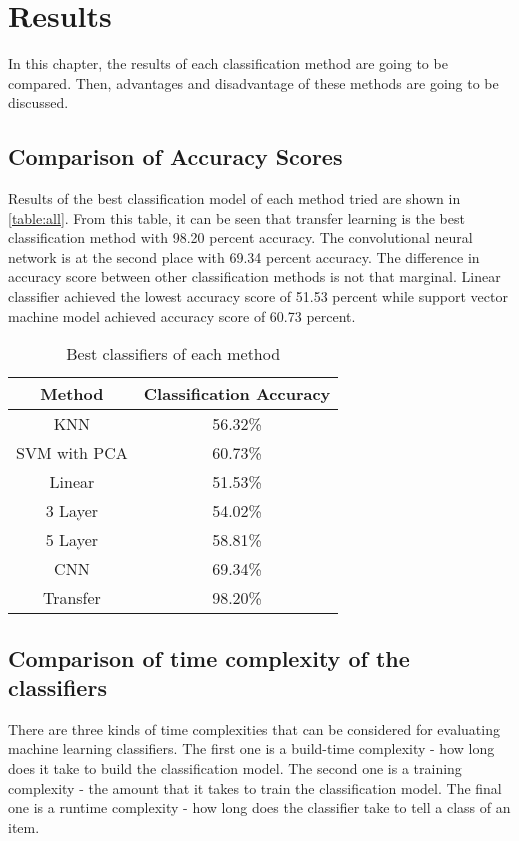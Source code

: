 
\chapter{Results}
In this chapter, the results of each classification method are going to be compared. Then, advantages and disadvantage of these methods are going to be discussed.

\section{Comparison of Accuracy Scores}

Results of the best classification model of each method tried are shown in  \autoref{table:all}. From this table, it can be seen that transfer learning is the best classification method with 98.20 percent accuracy. The convolutional neural network is at the second place with 69.34 percent accuracy.  The difference in accuracy score between other classification methods is not that marginal. Linear classifier achieved the lowest accuracy score of 51.53 percent while support vector machine model achieved accuracy score of 60.73 percent. 

\begin{table}[h]
\begin{center}
\begin{tabular}{ |c|c| } 
 \hline
Method &  Classification Accuracy \\   \hline
KNN    &  56.32\% \\
SVM with PCA   & 60.73\% \\
Linear   &    51.53\%  \\
3 Layer    &   54.02\% \\
5 Layer    &  58.81\% \\
CNN & 69.34\% \\
Transfer  &  98.20\% \\

 \hline
\end{tabular}
\caption{Best classifiers of each method}
\label{table:all}
\end{center}
\end{table}


\section{Comparison  of time complexity of the classifiers}
There are three kinds of time complexities that can be considered for evaluating machine learning classifiers. The first one is a build-time complexity - how long does it take to build the classification model. The second one is a training complexity - the amount that it takes to train the classification model. The final one is a runtime complexity - how long does the classifier take to tell a class of an item. 

